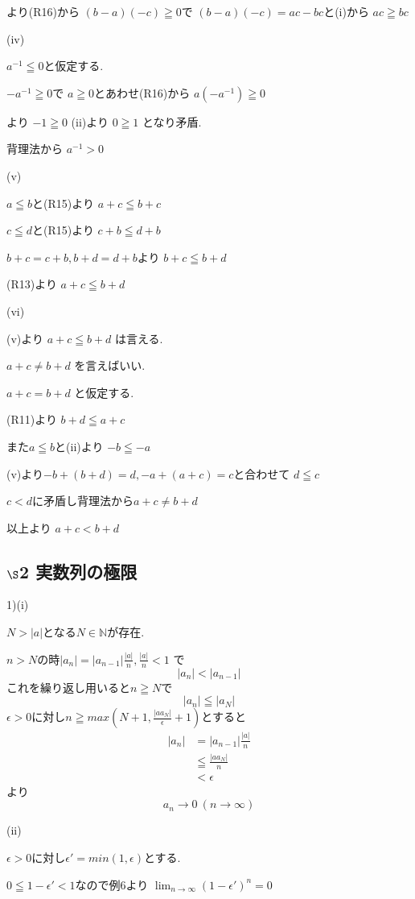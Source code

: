 \documentclass{jsarticle}
\begin{document}
より(R16)から
$(b-a)(-c)\geqq 0$で
$(b-a)(-c)=ac-bc$と(i)から
$ac\geqq bc$


(iv)

$a^{-1}\leqq 0$と仮定する.

$-a^{-1}\geqq 0$で
$a\geqq 0$とあわせ(R16)から
$a(-a^{-1})\geqq 0$

より
$-1\geqq 0$
(ii)より
$0\geqq 1$
となり矛盾.

背理法から
$a^{-1}>0$


(v)

$a\leqq b$と(R15)より
$a+c \leqq b+c$

$c\leqq d$と(R15)より
$c+b \leqq d+b$

$b+c=c+b,b+d=d+b$より
$b+c \leqq b+d$

(R13)より
$a+c\leqq b+d$


(vi)


(v)より
$a+c\leqq b+d$
は言える.

$a+c\neq b+d$
を言えばいい.

$a+c = b+d$
と仮定する.

(R11)より
$b+d\leqq a+c$

また$a\leqq b$と(ii)より
$-b\leqq -a$

(v)より$-b+(b+d)=d,-a+(a+c)=c$と合わせて
$d\leqq c$

$c<d$に矛盾し背理法から$a+c\neq b+d$


以上より
$a+c < b+d$


\subsection*{$\S$2 実数列の極限}
1)(i)

$N>|a|$となる$N\in\mathbb{N}$が存在.

$n>N$の時$|a_n| = |a_{n-1}|\frac{|a|}{n},\frac{|a|}{n}<1$ で
\[|a_n| < |a_{n-1}|\]
これを繰り返し用いると$n\geqq N$で
\[|a_n| \leqq |a_N|\]
$\epsilon > 0$に対し$n \geqq max(N+1,\frac{|aa_N|}{\epsilon}+1)$とすると
\begin{align*}
|a_n| &= |a_{n-1}|\frac{|a|}{n}\\
&\leqq \frac{|aa_N|}{n} \\
&< \epsilon
\end{align*}
より
\[a_n\to0 \ (n\to \infty)\]


(ii)

$\epsilon > 0$に対し$\epsilon'=min(1,\epsilon)$とする.

$0\leqq 1-\epsilon' < 1$なので例6より
$\displaystyle \lim_{n\to \infty}(1-\epsilon')^n = 0$
\end{document}
